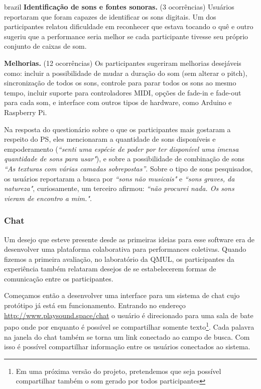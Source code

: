 \begin{otherlanguage*}{brazil}
\textbf{Identificação de sons e fontes sonoras.} (3 ocorrências)  Usuários reportaram que foram capazes de identificar os sons digitais. Um dos participantes relatou dificuldade em reconhecer que estava tocando o quê e outro sugeriu que a performance seria melhor se cada participante tivesse seu próprio conjunto de caixas de som.

\textbf{Melhorias.} (12 ocorrências) Os participantes sugeriram melhorias desejáveis como: incluir a possibilidade de mudar a duração do som (sem alterar o pitch), sincronização de todos os sons, controle para parar todos os sons ao mesmo tempo, incluir suporte para controladores MIDI, opções de fade-in e fade-out para cada som, e interface com outros tipos de hardware, como Arduino e Raspberry Pi. 

Na resposta do questionário sobre o que os participantes mais gostaram a respeito do PS, eles mencionaram a quantidade de sons disponíveis e empoderamento (\textit{``senti uma espécie de poder por ter disponível uma imensa quantidade de sons para usar"}), e sobre a possibilidade de combinação de sons \textit{``As texturas com várias camadas sobrepostas''}. Sobre o tipo de sons pesquisados, os usuários reportaram a busca por  \textit{``sons não musicais"} e \textit{``sons graves, da natureza"}, curiosamente, um terceiro afirmou: \textit{``não procurei nada. Os sons vieram de encontro a mim."}.

\subsubsection{Chat}
Um desejo que esteve presente desde as primeiras ideias para esse software era de desenvolver uma plataforma colaborativa para performances coletivas. Quando fizemos a primeira avaliação, no laboratório da QMUL, os participantes da experiência também relataram desejos de se estabelecerem formas de comunicação entre os participantes.

Começamos então a desenvolver uma interface para um sistema de chat cujo protótipo já está em funcionamento. Entrando no endereço \url{http://www.playsound.space/chat} o usuário é direcionado para uma sala de bate papo onde por enquanto é possível se compartilhar somente texto\footnote{Em uma próxima versão do projeto, pretendemos que seja possível compartilhar também o som gerado por todos participantes}. Cada palavra na janela do chat também se torna um link conectado ao campo de busca. Com isso é possível compartilhar informação entre os usuários conectados ao sistema.


\end{otherlanguage*}
